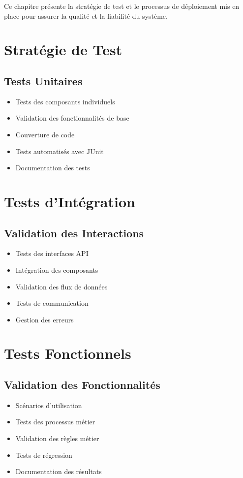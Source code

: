 Ce chapitre présente la stratégie de test et le processus de déploiement mis en place pour assurer la qualité et la fiabilité du système.

\section{Stratégie de Test}
\subsection{Tests Unitaires}
\begin{itemize}
    \item Tests des composants individuels
    \item Validation des fonctionnalités de base
    \item Couverture de code
    \item Tests automatisés avec JUnit
    \item Documentation des tests
\end{itemize}

\section{Tests d'Intégration}
\subsection{Validation des Interactions}
\begin{itemize}
    \item Tests des interfaces API
    \item Intégration des composants
    \item Validation des flux de données
    \item Tests de communication
    \item Gestion des erreurs
\end{itemize}

\section{Tests Fonctionnels}
\subsection{Validation des Fonctionnalités}
\begin{itemize}
    \item Scénarios d'utilisation
    \item Tests des processus métier
    \item Validation des règles métier
    \item Tests de régression
    \item Documentation des résultats
\end{itemize}

